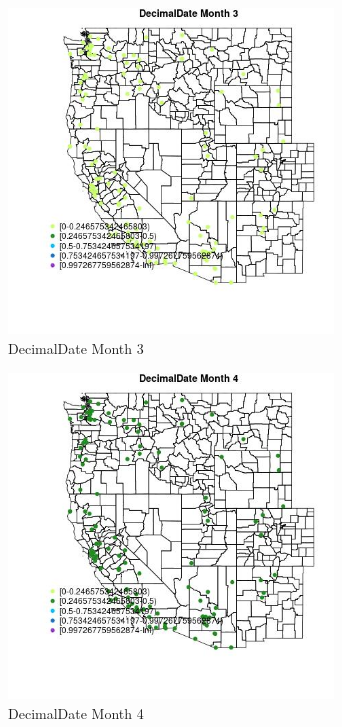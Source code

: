 \begin{figure} 
\centering  
\includegraphics[width=0.77\textwidth]{Code_Outputs/Report_ML_input_PM25_Step4_part_e_de_duplicated_aves_MapObsMo3DecimalDate.jpg} 
\caption{\label{fig:Report_ML_input_PM25_Step4_part_e_de_duplicated_avesMapObsMo3DecimalDate}DecimalDate Month 3} 
\end{figure} 
 

\begin{figure} 
\centering  
\includegraphics[width=0.77\textwidth]{Code_Outputs/Report_ML_input_PM25_Step4_part_e_de_duplicated_aves_MapObsMo4DecimalDate.jpg} 
\caption{\label{fig:Report_ML_input_PM25_Step4_part_e_de_duplicated_avesMapObsMo4DecimalDate}DecimalDate Month 4} 
\end{figure} 
 

